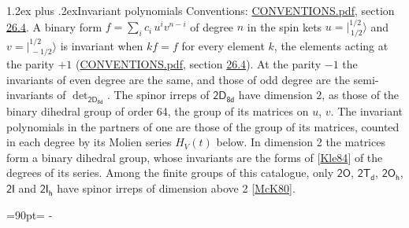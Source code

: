 \documentclass[10pt,a4paper]{article}
\makeatletter
\renewcommand\section{\@startsection{section}{1}{\z@}{-3ex plus -1ex minus -.2ex}%
  {1.2ex plus .2ex}{\normalfont\large\sffamily\bfseries\color{parttitle}}}
\newcommand{\needspace}[1]{\par\penalty-100\begingroup\dimen0=#1\relax\dimen2=\pagegoal
  \advance\dimen2-\pagetotal\ifdim\dimen0>\dimen2\relax\ifdim\dimen2>0pt\vfil\break\fi\fi
  \endgroup}
\numberwithin{equation}{section}
\newcommand{\grp}[1]{\mathsf{#1}}
\newcommand{\jm}[2]{\bigl\lvert{}^{#1}_{\,#2}\bigr\rangle}
\makeatother
\begin{document}
\section{Invariant polynomials}\label{s:invariants}
Conventions: \href{../../CONVENTIONS.pdf}{CONVENTIONS.pdf}, section \href{../../CONVENTIONS.pdf\#conv.26.4}{26.4}.
\leavevmode\label{n:local.binary.form}A binary form $f = \sum_i c_i\, u^i v^{n-i}$ of degree $n$ in the spin kets $u = \jm{1/2}{1/2}$ and $v = \jm{1/2}{-1/2}$ is invariant when $k f = f$ for every element $k$, the elements acting at the parity $+1$ (\href{../../CONVENTIONS.pdf}{CONVENTIONS.pdf}, section \href{../../CONVENTIONS.pdf\#conv.26.4}{26.4}). At the parity $-1$ the invariants of even degree are the same, and those of odd degree are the semi-invariants of $\det_{\grp{2D_{8d}}}$.
The spinor irreps of $\grp{2D_{8d}}$ have dimension 2, as those of the binary dihedral group of order 64, the group of its matrices on $u$, $v$. \label{n:function.hilbert}The invariant polynomials in the partners of one are those of the group of its matrices, counted in each degree by its Molien series $H_V(t)$ below. In dimension 2 the matrices form a binary dihedral group, whose invariants are the forms of [\href{../../../REFERENCES.pdf\#ref.Kle84}{Kle84}] of the degrees of its series. Among the finite groups of this catalogue, only $\grp{2O}$, $\grp{2T_{d}}$, $\grp{2O_{h}}$, $\grp{2I}$ and $\grp{2I_{h}}$ have spinor irreps of dimension above 2 [\href{../../../REFERENCES.pdf\#ref.McK80}{McK80}].
\needspace{90pt}
\end{document}
